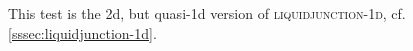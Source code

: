 
This test is the 2d, but quasi-1d version of \textsc{liquidjunction-1d}, cf. \cref{sssec:liquidjunction-1d}.

